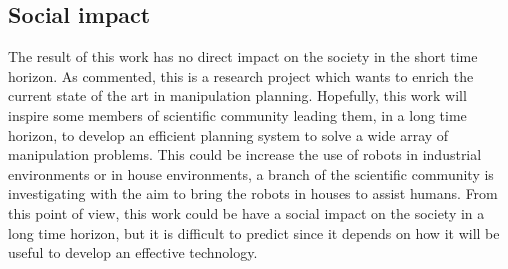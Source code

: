 \subsection*{Social impact}
The result of this work has no direct impact on the society in the short time horizon. As commented, this is a research project which wants to enrich the current state of the art in manipulation planning. Hopefully, this work will inspire some members of scientific community leading them, in a long time horizon, to develop an efficient planning system to solve a wide array of manipulation problems. This could be increase the use of robots in industrial environments or in house environments, a branch of the scientific community is investigating with the aim to bring the robots in houses to assist humans. From this point of view, this work could be have a social impact on the society in a long time horizon, but it is difficult to predict since it depends on how it will be useful to develop an effective technology. 
